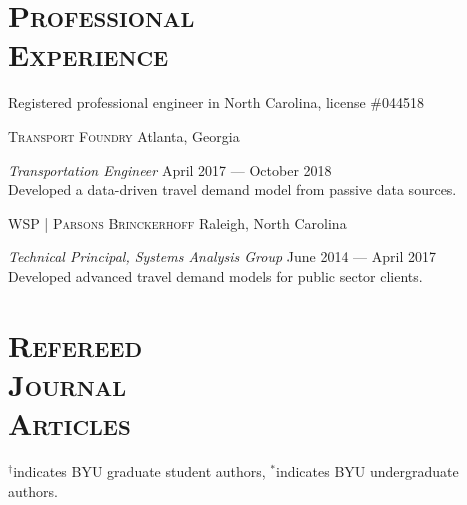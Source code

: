 \documentclass[margin,line]{res}
\newif\ifdetail
\newcommand{\secfont}{\scshape }
\newcommand{\acc}{\scshape }
\begin{document}
\begin{resume}
\noindent\makebox[\linewidth]{\rule{\linewidth}{0.4pt}}

\section{\secfont Professional \\ Experience}

Registered professional engineer in North Carolina, license \#044518

{\acc Transport Foundry} Atlanta, Georgia

\vspace{-.3cm}
\textit{Transportation Engineer} \hfill {April 2017 --- October 2018}\\
Developed a data-driven travel demand model from passive data sources.

{\acc WSP | Parsons Brinckerhoff} Raleigh, North Carolina

\vspace{-.3cm}
\textit{Technical Principal, Systems Analysis Group} \hfill {June 2014 --- April 2017}\\
Developed advanced travel demand models for public sector clients.

\noindent\makebox[\linewidth]{\rule{\linewidth}{0.4pt}}







\section{\secfont Refereed \\ Journal\\ Articles}
$^\dagger$indicates BYU graduate student authors, $^*$indicates BYU undergraduate authors.
\ifdetail 
Paper 1 came from my undergraduate work, papers 2 through 6 were from my doctoral research, and
papers 7 onward represent work completed during my time on the faculty at BYU. Number of citations
are from Google Scholar as of October 2024. Work published since my third year review appears in blue.\fi
\vspace{.3cm}


\end{resume}
\end{document}
